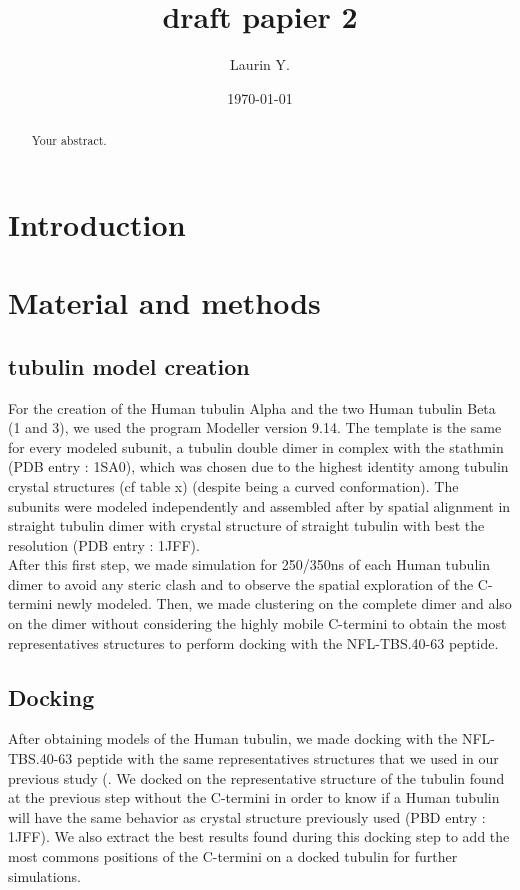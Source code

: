 \documentclass[a4paper]{article}
\title{draft papier 2}
\author{Laurin Y.}
\date{\today}
\begin{document}
\maketitle

\begin{abstract}
Your abstract.
\end{abstract}

\section{Introduction}

\section{Material and methods}

\subsection{tubulin model creation}


For the creation of the Human tubulin Alpha and the two Human tubulin Beta (1 and 3), we used the program 
Modeller version 9.14. The template is the same for every modeled subunit, a tubulin double dimer in complex 
with the stathmin (PDB entry : 1SA0), which was chosen due to the highest identity among tubulin crystal 
structures (cf table x) (despite being a curved conformation). The subunits were modeled independently 
and assembled after by spatial alignment in straight tubulin dimer with crystal structure of straight 
tubulin with best the resolution (PDB entry : 1JFF).
\\
After this first step, we made simulation for 250/350ns of each Human tubulin dimer to avoid any steric 
clash and to observe the spatial exploration of the C-termini newly modeled. Then, we made clustering on the 
complete dimer and also on the dimer without considering the highly mobile C-termini to obtain the most 
representatives structures to perform docking with the NFL-TBS.40-63 peptide.

\subsection{Docking}

After obtaining models of the Human tubulin, we made docking with the NFL-TBS.40-63 peptide with the same 
representatives structures that we used in our previous study (\cite{nfltbs40-63_tubulin_monpapier}. We docked 
on the representative structure of the tubulin found at the previous step without the C-termini in order to 
know if a Human tubulin will have the same behavior as crystal structure previously used (PBD entry : 1JFF). 
We also extract the best results found during this docking step to add the most commons positions of 
the C-termini on a docked tubulin for further simulations. 
\end{document}
